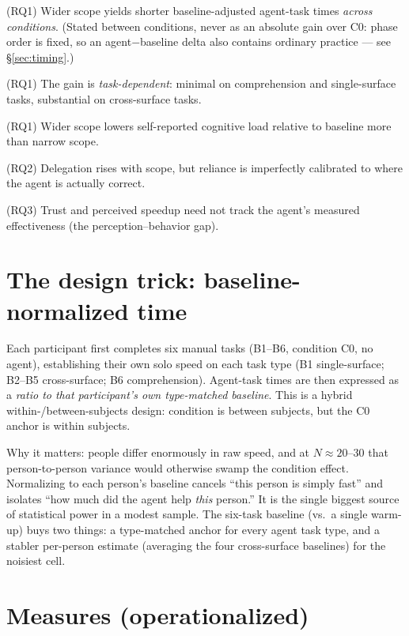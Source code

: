 \documentclass[11pt]{article}
\begin{document}
\begin{description}[leftmargin=3.0em,style=nextline,nosep]
  \item[H1] (RQ1) Wider scope yields shorter baseline-adjusted agent-task times
  \emph{across conditions}. (Stated between conditions, never as an absolute gain
  over C0: phase order is fixed, so an agent$-$baseline delta also contains
  ordinary practice --- see \S\ref{sec:timing}.)
  \item[H2] (RQ1) The gain is \emph{task-dependent}: minimal on comprehension and
  single-surface tasks, substantial on cross-surface tasks.
  \item[H3] (RQ1) Wider scope lowers self-reported cognitive load relative to
  baseline more than narrow scope.
  \item[H4] (RQ2) Delegation rises with scope, but reliance is
  imperfectly calibrated to where the agent is actually correct.
  \item[H5] (RQ3) Trust and perceived speedup need not track the agent's measured
  effectiveness (the perception--behavior gap).
\end{description}

\section{The design trick: baseline-normalized time}

Each participant first completes six manual tasks (B1--B6, condition C0, no
agent), establishing their own solo speed on each task type
(B1 single-surface; B2--B5 cross-surface; B6 comprehension). Agent-task times are
then expressed as a \emph{ratio to that participant's own type-matched baseline}.
This is a hybrid within-/between-subjects design: condition is between subjects,
but the C0 anchor is within subjects.

Why it matters: people differ enormously in raw speed, and at $N\approx20$--$30$
that person-to-person variance would otherwise swamp the condition effect.
Normalizing to each person's baseline cancels ``this person is simply fast'' and
isolates ``how much did the agent help \emph{this} person.'' It is the single
biggest source of statistical power in a modest sample. The six-task baseline
(vs.\ a single warm-up) buys two things: a type-matched anchor for every agent
task type, and a stabler per-person estimate (averaging the four cross-surface
baselines) for the noisiest cell.

\section{Measures (operationalized)}
\end{document}
